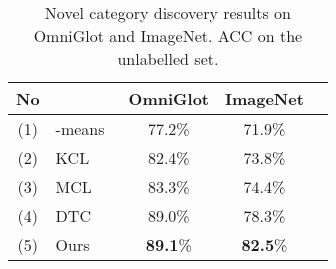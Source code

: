 \begin{table}[t]
 \centering
\caption{Novel category discovery results on OmniGlot and ImageNet. ACC on the unlabelled set.
}\label{tab:comparison_omniglot_imagenet}
  \begin{tabular}[c]{clccc}
    \toprule
    No  &                                      & OmniGlot        & ImageNet \\
    \midrule
    (1) & -means~\cite{MackQueen67_Kmeans} & 77.2\%          & 71.9\%   \\
    (2) & KCL~\cite{Hsu18_L2C}                & 82.4\%          & 73.8\%  \\
    (3) & MCL~\cite{Hsu19_MCL}                & 83.3\%          & 74.4\%  \\
    (4) & DTC~\cite{han2019learning}          & 89.0\%          & 78.3\% \\\midrule
    (5) & Ours                                 & \textbf{89.1}\% & \textbf{82.5}\% \\
    \bottomrule
  \end{tabular}
  \hfill

\end{table}

